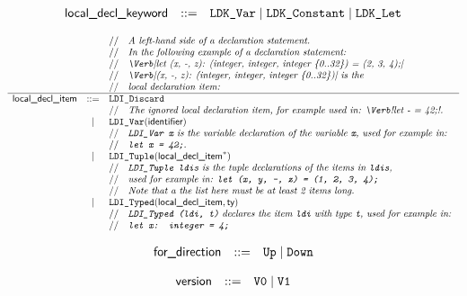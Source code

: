 \documentclass{book}
\begin{document}
\[
\begin{array}{rcl}
\textsf{local\_decl\_keyword} &::=& \texttt{LDK\_Var} \;|\; \texttt{LDK\_Constant} \;|\; \texttt{LDK\_Let}\\
\end{array}
\]

\[
\begin{array}{rcl}
  & & \ASTComment{A left-hand side of a declaration statement.}\\
  & & \ASTComment{In the following example of a declaration statement:}\\
  & & \ASTComment{\Verb|let (x, -, z): (integer, integer, integer \{0..32\}) = (2, 3, 4);|}\\
  & & \ASTComment{\Verb|(x, -, z): (integer, integer, integer \{0..32\})| is the}\\
  & & \ASTComment{local declaration item:}\\
  \hline
\localdeclitem &::=
    & \texttt{LDI\_Discard}\\
  & & \ASTComment{The ignored local declaration item, for example used in: \Verb!let - = 42;!.}\\
  &|& \texttt{LDI\_Var}(\identifier)\\
  & & \ASTComment{\texttt{LDI\_Var x} is the variable declaration of the variable \texttt{x}, used for example in:}\\
  & & \ASTComment{\texttt{let x = 42;}.}\\
  &|& \texttt{LDI\_Tuple}(\localdeclitem^*)\\
  & & \ASTComment{\texttt{LDI\_Tuple ldis} is the tuple declarations of the items in \texttt{ldis},}\\
  & & \ASTComment{used for example in: \texttt{let (x, y, -, z) = (1, 2, 3, 4);}}\\
  & & \ASTComment{Note that a the list here must be at least 2 items long.}\\
  &|& \texttt{LDI\_Typed}(\localdeclitem, \ty)\\
  & & \ASTComment{\texttt{LDI\_Typed (ldi, t)} declares the item \texttt{ldi} with type \texttt{t}, used for example in:} \\
  & & \ASTComment{\texttt{let x: integer = 4;}}
\end{array}
\]

\[
\begin{array}{rcl}
\textsf{for\_direction} &::=& \texttt{Up} \;|\; \texttt{Down}\\
\end{array}
\]

\[
\begin{array}{rcl}
\textsf{version} &::=& \texttt{V0} \;|\; \texttt{V1}\\
\end{array}
\]
\end{document}
